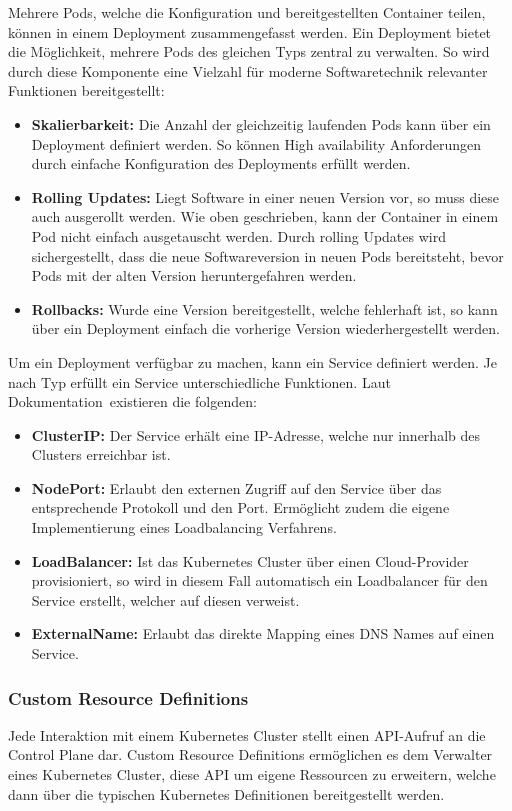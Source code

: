 Mehrere Pods, welche die Konfiguration und bereitgestellten Container teilen, können in einem Deployment zusammengefasst werden.
Ein Deployment bietet die Möglichkeit, mehrere Pods des gleichen Typs zentral zu verwalten.
So wird durch diese Komponente eine Vielzahl für moderne Softwaretechnik relevanter Funktionen bereitgestellt:

\begin{itemize}
    \item \textbf{Skalierbarkeit:} Die Anzahl der gleichzeitig laufenden Pods kann über ein Deployment definiert werden.
    So können High availability Anforderungen durch einfache Konfiguration des Deployments erfüllt werden.
    \item \textbf{Rolling Updates:} Liegt Software in einer neuen Version vor, so muss diese auch ausgerollt werden.
    Wie oben geschrieben, kann der Container in einem Pod nicht einfach ausgetauscht werden.
    Durch rolling Updates wird sichergestellt, dass die neue Softwareversion in neuen Pods bereitsteht, bevor Pods mit der alten Version heruntergefahren werden.
    \item \textbf{Rollbacks:} Wurde eine Version bereitgestellt, welche fehlerhaft ist, so kann über ein Deployment einfach die vorherige Version wiederhergestellt werden.
\end{itemize}

Um ein Deployment verfügbar zu machen, kann ein Service definiert werden.
Je nach Typ erfüllt ein Service unterschiedliche Funktionen.
Laut Dokumentation~\cite{kubernetesservices}existieren die folgenden:

\begin{itemize}
    \item \textbf{ClusterIP:} Der Service erhält eine IP-Adresse, welche nur innerhalb des Clusters erreichbar ist.
    \item \textbf{NodePort:} Erlaubt den externen Zugriff auf den Service über das entsprechende Protokoll und den Port.
    Ermöglicht zudem die eigene Implementierung eines Loadbalancing Verfahrens.
    \item \textbf{LoadBalancer:} Ist das Kubernetes Cluster über einen Cloud-Provider provisioniert, so wird in diesem Fall automatisch ein Loadbalancer für den Service erstellt, welcher auf diesen verweist.
    \item \textbf{ExternalName:} Erlaubt das direkte Mapping eines DNS Names auf einen Service.
\end{itemize}

\subsubsection{Custom Resource Definitions}
Jede Interaktion mit einem Kubernetes Cluster stellt einen API-Aufruf an die Control Plane dar.
Custom Resource Definitions ermöglichen es dem Verwalter eines Kubernetes Cluster, diese API um eigene Ressourcen zu erweitern, welche dann über die typischen Kubernetes Definitionen bereitgestellt werden.

\newpage

